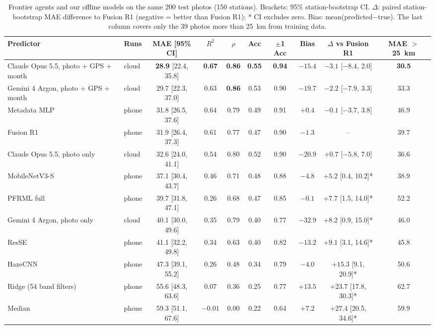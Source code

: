 \documentclass[conference]{IEEEtran}
\begin{document}
\begin{table}[!t]
  \centering
  \caption{Frontier agents and our offline models on the same 200 test photos
  (150 stations). Brackets: 95\% station-bootstrap CI. $\Delta$: paired
  station-bootstrap MAE difference to Fusion R1 (negative = better than Fusion
  R1); * CI excludes zero. Bias: mean(predicted$-$true). The last column covers
  only the 39 photos more than 25~km from training data.}
  \label{tab:frontier}
  \setlength{\tabcolsep}{4pt}
  \begin{tabular}{llcccccccc}
    \toprule
    Predictor & Runs & MAE [95\% CI] & $R^2$ & $\rho$ & Acc & $\pm$1 Acc & Bias & $\Delta$ vs Fusion R1 & MAE $>$25~km \\
    \midrule
    Claude Opus 5.5, photo + GPS + month & cloud & \textbf{28.9} [22.4, 35.8] & \textbf{0.67} & \textbf{0.86} & \textbf{0.55} & \textbf{0.94} & $-15.4$ & $-3.1$ [$-8.4$, 2.0] & \textbf{30.5} \\
    Gemini 4 Argon, photo + GPS + month & cloud & 29.7 [22.3, 37.0] & 0.63 & \textbf{0.86} & 0.53 & 0.90 & $-19.7$ & $-2.2$ [$-7.9$, 3.3] & 33.3 \\
    Metadata MLP & phone & 31.8 [26.5, 37.6] & 0.64 & 0.79 & 0.49 & 0.91 & $+0.4$ & $-0.1$ [$-3.7$, 3.8] & 46.9 \\
    Fusion R1 & phone & 31.9 [26.4, 37.3] & 0.61 & 0.77 & 0.47 & 0.90 & $-1.3$ & -- & 39.7 \\
    Claude Opus 5.5, photo only & cloud & 32.6 [24.0, 41.1] & 0.54 & 0.80 & 0.52 & 0.90 & $-20.9$ & $+0.7$ [$-5.8$, 7.0] & 36.6 \\
    MobileNetV3-S & phone & 37.1 [30.4, 43.7] & 0.46 & 0.71 & 0.48 & 0.88 & $-4.8$ & $+5.2$ [0.4, 10.2]* & 38.9 \\
    PFRML full & phone & 39.7 [31.8, 47.1] & 0.26 & 0.68 & 0.47 & 0.85 & $-0.1$ & $+7.7$ [1.5, 14.0]* & 52.2 \\
    Gemini 4 Argon, photo only & cloud & 40.1 [30.0, 49.6] & 0.35 & 0.79 & 0.40 & 0.77 & $-32.9$ & $+8.2$ [0.9, 15.0]* & 46.0 \\
    ResSE & phone & 41.1 [32.2, 49.8] & 0.34 & 0.63 & 0.40 & 0.82 & $-13.2$ & $+9.1$ [3.1, 14.6]* & 45.8 \\
    HazeCNN & phone & 47.3 [39.1, 55.2] & 0.26 & 0.48 & 0.34 & 0.79 & $-4.0$ & $+15.3$ [9.1, 20.9]* & 50.6 \\
    Ridge (54 band filters) & phone & 55.6 [48.3, 63.6] & 0.07 & 0.36 & 0.25 & 0.77 & $+13.5$ & $+23.7$ [17.8, 30.3]* & 62.7 \\
    Median & phone & 59.3 [51.1, 67.6] & $-0.01$ & 0.00 & 0.22 & 0.64 & $+7.2$ & $+27.4$ [20.5, 34.6]* & 59.9 \\
    \bottomrule
  \end{tabular}
\end{table}
\end{document}
